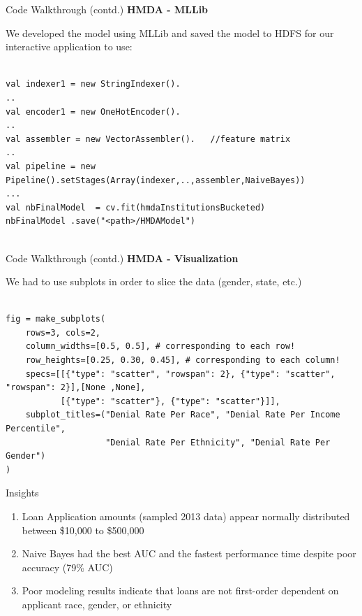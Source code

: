 \documentclass{beamer}
\begin{document}
\begin{frame}[fragile]{Code Walkthrough (contd.)}
\textbf{HMDA - MLLib}

We developed the model using MLLib and saved the model to HDFS for our interactive application to use: 

\begin{lstlisting}

val indexer1 = new StringIndexer().
..
val encoder1 = new OneHotEncoder().
..
val assembler = new VectorAssembler().   //feature matrix
..
val pipeline = new Pipeline().setStages(Array(indexer,..,assembler,NaiveBayes))
...
val nbFinalModel  = cv.fit(hmdaInstitutionsBucketed)
nbFinalModel .save("<path>/HMDAModel")


\end{lstlisting}

\end{frame}

\begin{frame}[fragile]{Code Walkthrough (contd.)}
\textbf{HMDA - Visualization}

We had to use subplots in order to slice the data (gender, state, etc.)

\begin{lstlisting}

fig = make_subplots(
    rows=3, cols=2,
    column_widths=[0.5, 0.5], # corresponding to each row!
    row_heights=[0.25, 0.30, 0.45], # corresponding to each column!
    specs=[[{"type": "scatter", "rowspan": 2}, {"type": "scatter", "rowspan": 2}],[None ,None],
           [{"type": "scatter"}, {"type": "scatter"}]],
    subplot_titles=("Denial Rate Per Race", "Denial Rate Per Income Percentile", 
                    "Denial Rate Per Ethnicity", "Denial Rate Per Gender")
)

\end{lstlisting}

\end{frame}


\begin{frame}{Insights}

\begin{enumerate}

\item Loan Application amounts (sampled 2013 data) appear normally distributed between \$10,000 to \$500,000
\item Naive Bayes had the best AUC and the fastest performance time despite poor accuracy (79\% AUC)
\item Poor modeling results indicate that loans are not first-order dependent on applicant race, gender, or ethnicity

\end{enumerate}

\end{frame}
\end{document}
